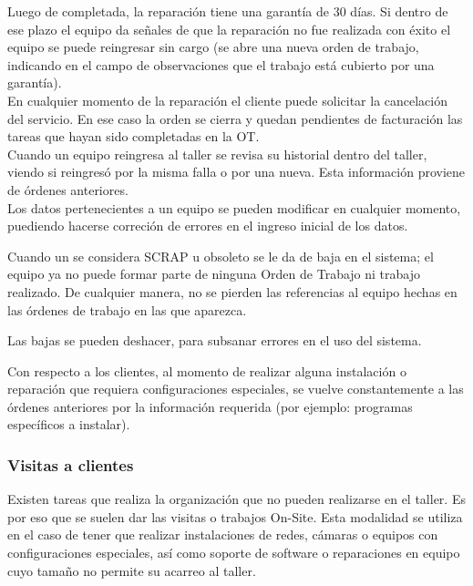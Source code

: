 \documentclass[12pt]{extarticle}
\begin{document}
\begin{spacing}{1.2}
        Luego de completada, la reparación tiene una garantía de 30 días. Si dentro de ese plazo el equipo da señales de que la reparación no fue realizada con éxito el equipo se puede reingresar sin cargo (se abre una nueva orden de trabajo, indicando en el campo de observaciones que el trabajo está cubierto por una garantía). \\
        
        En cualquier momento de la reparación el cliente puede solicitar la cancelación del servicio. En ese caso la orden se cierra y quedan pendientes de facturación las tareas que hayan sido completadas en la OT.\\

        Cuando un equipo reingresa al taller se revisa su historial dentro del taller, viendo si reingresó por la misma falla o por una nueva. Esta información proviene de órdenes anteriores. \\

        Los datos pertenecientes a un equipo se pueden modificar en cualquier momento, puediendo hacerse correción de errores en el ingreso inicial de los datos.

        Cuando un se considera SCRAP u obsoleto se le da de baja en el sistema; el equipo ya no puede formar parte de ninguna Orden de Trabajo ni trabajo realizado. De cualquier manera, no se pierden las referencias al equipo hechas en las órdenes de trabajo en las que aparezca.

        Las bajas se pueden deshacer, para subsanar errores en el uso del sistema.

        Con respecto a los clientes, al momento de realizar alguna instalación o reparación que requiera configuraciones especiales, se vuelve constantemente a las órdenes anteriores por la información requerida (por ejemplo: programas específicos a instalar).

        \subsubsection{Visitas a clientes}

        Existen tareas que realiza la organización que no pueden realizarse en el taller. Es por eso que se suelen dar las visitas o trabajos On-Site. Esta modalidad se utiliza en el caso de tener que realizar instalaciones de redes, cámaras o equipos con configuraciones especiales, así como soporte de software o reparaciones en equipo cuyo tamaño no permite su acarreo al taller.\\


\end{spacing}
\end{document}
